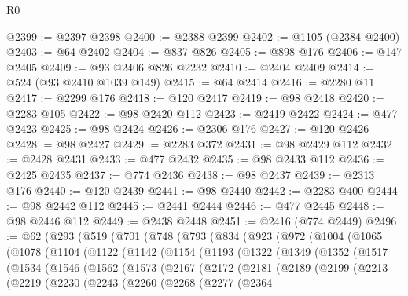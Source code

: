 \begin{lexlean}{R0}
\begin{coremodule}
@2399 := @2397 @2398
@2400 := @2388 @2399
@2402 := @1105 (@2384 @2400)
@2403 := @64 @2402
@2404 := @837 @826
@2405 := @898 @176
@2406 := @147 @2405
@2409 := @93 @2406 @826 @2232
@2410 := @2404 @2409
@2414 := @524 (@93 @2410 @1039 @149)
@2415 := @64 @2414
@2416 := @2280 @11
@2417 := @2299 @176
@2418 := @120 @2417
@2419 := @98 @2418
@2420 := @2283 @105
@2422 := @98 @2420 @112
@2423 := @2419 @2422
@2424 := @477 @2423
@2425 := @98 @2424
@2426 := @2306 @176
@2427 := @120 @2426
@2428 := @98 @2427
@2429 := @2283 @372
@2431 := @98 @2429 @112
@2432 := @2428 @2431
@2433 := @477 @2432
@2435 := @98 @2433 @112
@2436 := @2425 @2435
@2437 := @774 @2436
@2438 := @98 @2437
@2439 := @2313 @176
@2440 := @120 @2439
@2441 := @98 @2440
@2442 := @2283 @400
@2444 := @98 @2442 @112
@2445 := @2441 @2444
@2446 := @477 @2445
@2448 := @98 @2446 @112
@2449 := @2438 @2448
@2451 := @2416 (@774 @2449)
@2496 := @62
    (@293
      (@519
        (@701
          (@748
            (@793
              (@834
                (@923
                  (@972
                    (@1004
                      (@1065
                        (@1078
                          (@1104
                            (@1122
                              (@1142
                                (@1154
                                  (@1193
                                    (@1322
                                      (@1349
                                        (@1352
                                          (@1517
                                            (@1534
                                              (@1546
                                                (@1562
                                                  (@1573
                                                    (@2167
                                                      (@2172
                                                        (@2181
                                                          (@2189
                                                            (@2199
                                                              (@2213
                                                                (@2219
                                                                  (@2230
                                                                    (@2243
                                                                      (@2260
                                                                        (@2268
                                                                          (@2277
                                                                            (@2364

\end{coremodule}
\end{lexlean}
